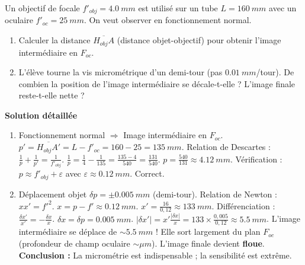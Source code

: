 \documentclass[11pt]{article}
\begin{document}
\begin{exoresolu}
Un objectif de focale $f'_{obj} = \SI{4,0}{mm}$ est utilisé sur un tube $L = \SI{160}{mm}$ avec un oculaire $f'_{oc} = \SI{25}{mm}$. On veut observer en fonctionnement normal.
\begin{enumerate}
    \item Calculer la distance $\overline{H_{obj}A}$ (distance objet-objectif) pour obtenir l'image intermédiaire en $F_{oc}$.
    \item L'élève tourne la vis micrométrique d'un demi-tour (pas $\SI{0,01}{mm}$/tour). De combien la position de l'image intermédiaire se décale-t-elle ? L'image finale reste-t-elle nette ?
\end{enumerate}
\textbf{Solution détaillée}
\begin{enumerate}
    \item Fonctionnement normal $\Rightarrow$ Image intermédiaire en $F_{oc}$.
        $p' = \overline{H_{obj}A'} = L - f'_{oc} = 160 - 25 = \SI{135}{mm}$.
        Relation de Descartes : $\frac{1}{p} + \frac{1}{p'} = \frac{1}{f'_{obj}}$.
        $\frac{1}{p} = \frac{1}{4} - \frac{1}{135} = \frac{135 - 4}{540} = \frac{131}{540}$.
        $p = \frac{540}{131} \approx \SI{4,12}{mm}$.
        Vérification : $p \approx f'_{obj} + \varepsilon$ avec $\varepsilon \approx \SI{0,12}{mm}$. Correct.
    \item Déplacement objet $\delta p = \pm \SI{0,005}{mm}$ (demi-tour).
        Relation de Newton : $x x' = f'^2$. $x = p - f' \approx \SI{0,12}{mm}$. $x' = \frac{16}{0,12} \approx \SI{133}{mm}$.
        Différenciation : $\frac{\delta x'}{x'} = -\frac{\delta x}{x}$.
        $\delta x = \delta p = \SI{0,005}{mm}$.
        $|\delta x'| = x' \frac{|\delta x|}{x} = 133 \times \frac{0,005}{0,12} \approx \SI{5,5}{mm}$.
        L'image intermédiaire se déplace de $\sim \SI{5,5}{mm}$ ! Elle sort largement du plan $F_{oc}$ (profondeur de champ oculaire $\sim \mu m$). L'image finale devient \textbf{floue}.
        \textbf{Conclusion :} La micrométrie est indispensable ; la sensibilité est extrême.
\end{enumerate}
\end{exoresolu}
\end{document}
